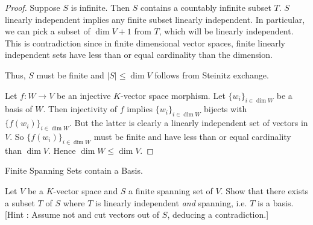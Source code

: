 \documentclass[../../book.tex]{subfiles}
\begin{document}
\begin{proof}
    Suppose $S$ is infinite. Then $S$ contains a countably infinite subset $T$.
    $S$ linearly independent implies any finite subset linearly independent.
    In particular, we can pick a subset of $\dim V + 1$ from $T$,
    which will be linearly independent. 
    This is contradiction since in finite dimensional vector spaces,
    finite linearly independent sets 
    have less than or equal cardinality than the dimension.
    
    Thus, $S$ must be finite and $|S| \leq \dim V$ follows from Steinitz exchange.
    
    Let $f : W \to V$ be an injective $K$-vector space morphism. 
    Let $\{w_i\}_{i\in\dim W}$ be a basis of $W$. 
    Then injectivity of $f$ implies $\{w_i\}_{i\in\dim W}$ bijects with
    $\{f(w_i)\}_{i\in\dim W}$.
    But the latter is clearly a linearly independent set of vectors in $V$.
    So $\{f(w_i)\}_{i\in\dim W}$ must be finite and 
    have less than or equal cardinality than $\dim V$.
    Hence $\dim W \leq \dim V$. 
\end{proof}

\begin{ex} Finite Spanning Sets contain a Basis. 
    
    Let $V$ be a $K$-vector space and 
    $S$ a finite spanning set of $V$. 
    Show that there exists a subset $T$ of $S$ where 
    $T$ is linearly independent \emph{and} spanning, 
    i.e. $T$ is a basis. 
    [Hint : Assume not and cut vectors out of $S$, deducing a contradiction.]

\end{ex}
\end{document}
